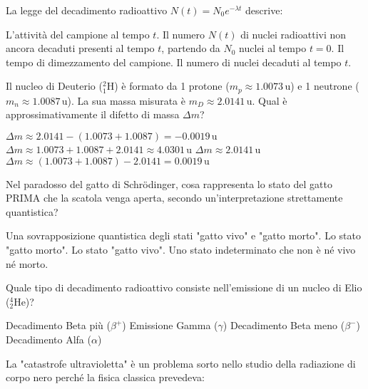 \documentclass{exam}%
\begin{document}
\begin{questions}%
\question La legge del decadimento radioattivo $N(t) = N_0 e^{-\lambda t}$ descrive:%
\vspace{0.2em}%
\begin{choices}%
\choice L'attività del campione al tempo $t$.%
\choice Il numero $N(t)$ di nuclei radioattivi non ancora decaduti presenti al tempo $t$, partendo da $N_0$ nuclei al tempo $t=0$.%
\choice Il tempo di dimezzamento del campione.%
\choice Il numero di nuclei decaduti al tempo $t$.%
\end{choices}%
\question Il nucleo di Deuterio ($^2_1\text{H}$) è formato da 1 protone ($m_p \approx 1.0073 \, \text{u}$) e 1 neutrone ($m_n \approx 1.0087 \, \text{u}$). La sua massa misurata è $m_D \approx 2.0141 \, \text{u}$. Qual è approssimativamente il difetto di massa $\Delta m$?%
\vspace{0.2em}%
\begin{multicols}{2}%
\begin{choices}%
\choice $\Delta m \approx 2.0141 - (1.0073 + 1.0087) = -0.0019 \, \text{u}$%
\choice $\Delta m \approx 1.0073 + 1.0087 + 2.0141 \approx 4.0301 \, \text{u}$%
\choice $\Delta m \approx 2.0141 \, \text{u}$%
\choice $\Delta m \approx (1.0073 + 1.0087) - 2.0141 = 0.0019 \, \text{u}$%
\end{choices}%
\end{multicols}%
\question Nel paradosso del gatto di Schrödinger, cosa rappresenta lo stato del gatto PRIMA che la scatola venga aperta, secondo un'interpretazione strettamente quantistica?%
\vspace{0.2em}%
\begin{choices}%
\choice Una sovrapposizione quantistica degli stati "gatto vivo" e "gatto morto".%
\choice Lo stato "gatto morto".%
\choice Lo stato "gatto vivo".%
\choice Uno stato indeterminato che non è né vivo né morto.%
\end{choices}%
\question Quale tipo di decadimento radioattivo consiste nell'emissione di un nucleo di Elio ($^4_2\text{He}$)?%
\vspace{0.2em}%
\begin{multicols}{2}%
\begin{choices}%
\choice Decadimento Beta più ($\beta^+$)%
\choice Emissione Gamma ($\gamma$)%
\choice Decadimento Beta meno ($\beta^-$)%
\choice Decadimento Alfa ($\alpha$)%
\end{choices}%
\end{multicols}%
\question La "catastrofe ultravioletta" è un problema sorto nello studio della radiazione di corpo nero perché la fisica classica prevedeva:%

\end{questions}
\end{document}
